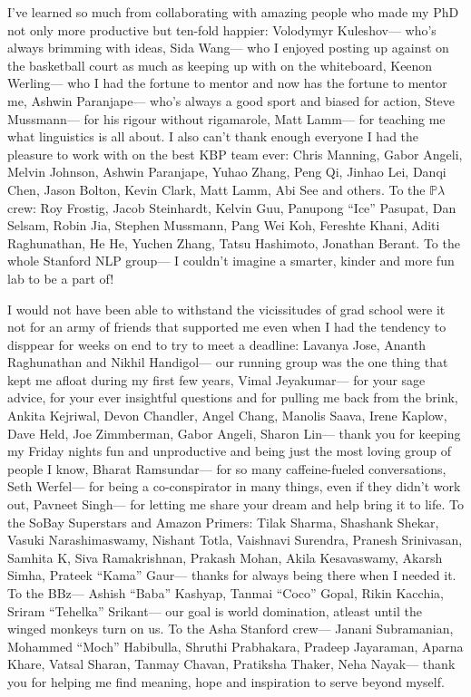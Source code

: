 I've learned so much from collaborating with amazing people who made my PhD not only more productive but ten-fold happier:
Volodymyr Kuleshov--- who's always brimming with ideas,
Sida Wang--- who I enjoyed posting up against on the basketball court as much as keeping up with on the whiteboard,
Keenon Werling--- who I had the fortune to mentor and now has the fortune to mentor me,
Ashwin Paranjape--- who's always a good sport and biased for action,
Steve Mussmann--- for his rigour without rigamarole,
Matt Lamm--- for teaching me what linguistics is all about.
I also can't thank enough everyone I had the pleasure to work with on the best KBP team ever: Chris Manning, Gabor Angeli, Melvin Johnson, Ashwin Paranjape, Yuhao Zhang, Peng Qi, Jinhao Lei, Danqi Chen, Jason Bolton, Kevin Clark, Matt Lamm, Abi See and others.
To the $\mathbb{P}\lambda$ crew: Roy Frostig, Jacob Steinhardt, Kelvin Guu, Panupong ``Ice'' Pasupat, Dan Selsam, Robin Jia, Stephen Mussmann, Pang Wei Koh, Fereshte Khani, Aditi Raghunathan, He He, Yuchen Zhang, Tatsu Hashimoto, Jonathan Berant.
To the whole Stanford NLP group--- I couldn't imagine a smarter, kinder and more fun lab to be a part of!

I would not have been able to withstand the vicissitudes of grad school were it not for an army of friends that supported me even when I had the tendency to disppear for weeks on end to try to meet a deadline:
Lavanya Jose, Ananth Raghunathan and Nikhil Handigol--- our running group was the one thing that kept me afloat during my first few years,
Vimal Jeyakumar--- for your sage advice, for your ever insightful questions and for pulling me back from the brink,
Ankita Kejriwal, Devon Chandler, Angel Chang, Manolis Saava, Irene Kaplow, Dave Held, Joe Zimmberman, Gabor Angeli, Sharon Lin--- thank you for keeping my Friday nights fun and unproductive and being just the most loving group of people I know,
Bharat Ramsundar--- for so many caffeine-fueled conversations,
Seth Werfel--- for being a co-conspirator in many things, even if they didn't work out,
Pavneet Singh--- for letting me share your dream and help bring it to life.
To the SoBay Superstars and Amazon Primers: Tilak Sharma, Shashank Shekar, Vasuki Narashimaswamy, Nishant Totla, Vaishnavi Surendra, Pranesh Srinivasan, Samhita K, Siva Ramakrishnan, Prakash Mohan, Akila Kesavaswamy, Akarsh Simha, Prateek ``Kama'' Gaur--- thanks for always being there when I needed it.
To the BBz--- Ashish ``Baba'' Kashyap, Tanmai ``Coco'' Gopal, Rikin Kacchia, Sriram ``Tehelka'' Srikant--- our goal is world domination, atleast until the winged monkeys turn on us.
To the Asha Stanford crew--- Janani Subramanian, Mohammed ``Moch'' Habibulla, Shruthi Prabhakara, Pradeep Jayaraman, Aparna Khare, Vatsal Sharan, Tanmay Chavan, Pratiksha Thaker, Neha Nayak--- thank you for helping me find meaning, hope and inspiration to serve beyond myself.

